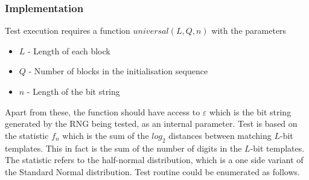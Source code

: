 \subsubsection{Implementation}

Test execution requires a function $universal(L,Q,n)$ with the parameters

\begin{itemize}
    \item $L$ - Length of each block
    \item $Q$ - Number of blocks in the initialisation sequence
    \item $n$ - Length of the bit string
\end{itemize}

Apart from these, the function should have access to $\varepsilon$ which is the bit string generated by the RNG being tested, as an internal parameter. Test is based on the statistic $f_n$ which is the sum of the $log_2$ distances between matching $L$-bit templates. This in fact is the sum of the number of digits in the $L$-bit templates. The statistic refers to the half-normal distribution, which is a one side variant of the Standard Normal distribution. Test routine could be enumerated as follows.

